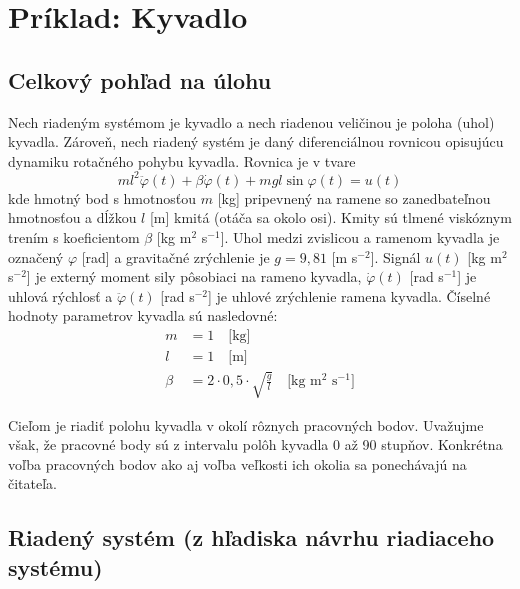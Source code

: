 \documentclass[a4paper, 10pt, ]{article}
\begin{document}
\section{Príklad: Kyvadlo}



\subsection{Celkový pohľad na úlohu}

Nech riadeným systémom je kyvadlo a nech riadenou veličinou je poloha (uhol) kyvadla. Zároveň, nech riadený systém je daný diferenciálnou rovnicou opisujúcu dynamiku rotačného pohybu kyvadla. Rovnica je v tvare
\begin{equation} \label{analOpRS}
    ml^2 \ddot{\varphi}(t) + \beta \dot{\varphi}(t) + mgl\sin{\varphi(t)} = u(t)
\end{equation}
kde hmotný bod s hmotnosťou $m$ [kg] pripevnený na ramene so zanedbateľnou hmotnosťou a dĺžkou $l$ [m] kmitá (otáča sa okolo osi). Kmity sú tlmené viskóznym trením s koeficientom $\beta$ [kg m$^2$ s$^{-1}$]. Uhol medzi zvislicou a ramenom kyvadla je označený $\varphi$ [rad] a gravitačné zrýchlenie je $g = 9,81$ [m s$^{-2}$]. Signál $u(t)$ [kg m$^2$ s$^{-2}$] je externý moment sily pôsobiaci na rameno kyvadla, $\dot{\varphi}(t)$ [rad s$^{-1}$] je uhlová rýchlosť a $\ddot{\varphi}(t)$ [rad s$^{-2}$] je uhlové zrýchlenie ramena kyvadla.
Číselné hodnoty parametrov kyvadla sú nasledovné:
\begin{align*}
	m &= 1 \quad \text{[kg]}\\
	l &= 1 \quad \text{[m]}\\
	\beta &= 2 \cdot 0,5 \cdot \sqrt{\frac{g}{l}} \quad \text{[kg m$^2$ s$^{-1}$]}
\end{align*}

Cieľom je riadiť polohu kyvadla v okolí rôznych pracovných bodov. Uvažujme však, že pracovné body sú z intervalu polôh kyvadla 0 až 90 stupňov. Konkrétna voľba pracovných bodov ako aj voľba veľkosti ich okolia sa ponechávajú na čitateľa.






\subsection{Riadený systém (z hľadiska návrhu riadiaceho systému)}
\end{document}
